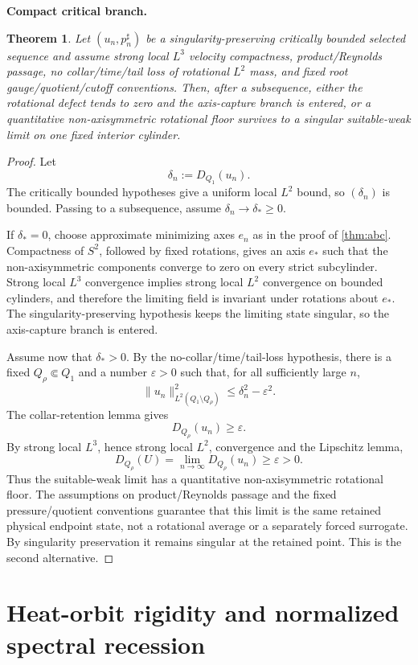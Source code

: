 \documentclass[11pt]{article}
\newtheorem{theorem}{Theorem}[section]
\theoremstyle{definition}\newtheorem{problem}[theorem]{Problem}
\theoremstyle{definition}
\theoremstyle{remark}
\begin{document}
\medskip
\noindent\textbf{Compact critical branch.}
\begin{theorem}
Let $(u_n,p_n^\sharp)$ be a singularity-preserving critically bounded selected
sequence and assume strong local $L^3$ velocity compactness, product/Reynolds
passage, no collar/time/tail loss of rotational $L^2$ mass, and fixed root
gauge/quotient/cutoff conventions.  Then, after a subsequence, either the
rotational defect tends to zero and the axis-capture branch is entered, or a
quantitative non-axisymmetric rotational floor survives to a singular
suitable-weak limit on one fixed interior cylinder.
\end{theorem}

\begin{proof}
Let
\[
 \delta_n:=D_{Q_1}(u_n).
\]
The critically bounded hypotheses give a uniform local \(L^2\) bound, so
\((\delta_n)\) is bounded.  Passing to a subsequence, assume
\(\delta_n\to\delta_*\ge0\).

If \(\delta_*=0\), choose approximate minimizing axes \(e_n\) as in the proof
of \cref{thm:abc}.  Compactness of \(S^2\), followed by fixed rotations, gives
an axis \(e_*\) such that the non-axisymmetric components converge to zero on
every strict subcylinder.  Strong local \(L^3\) convergence implies strong
local \(L^2\) convergence on bounded cylinders, and therefore the limiting
field is invariant under rotations about \(e_*\).  The singularity-preserving
hypothesis keeps the limiting state singular, so the axis-capture branch is
entered.

Assume now that \(\delta_*>0\).  By the no-collar/time/tail-loss hypothesis,
there is a fixed \(Q_\rho\Subset Q_1\) and a number \(\varepsilon>0\) such that,
for all sufficiently large \(n\),
\[
 \|u_n\|_{L^2(Q_1\setminus Q_\rho)}^2
 \le \delta_n^2-\varepsilon^2.
\]
The collar-retention lemma gives
\[
 D_{Q_\rho}(u_n)\ge\varepsilon.
\]
By strong local \(L^3\), hence strong local \(L^2\), convergence and the
Lipschitz lemma,
\[
 D_{Q_\rho}(U)
 =\lim_{n\to\infty}D_{Q_\rho}(u_n)
 \ge\varepsilon>0.
\]
Thus the suitable-weak limit has a quantitative non-axisymmetric rotational
floor.  The assumptions on product/Reynolds passage and the fixed
pressure/quotient conventions guarantee that this limit is the same retained
physical endpoint state, not a rotational average or a separately forced
surrogate.  By singularity preservation it remains singular at the retained
point.  This is the second alternative.
\end{proof}


\section{Heat-orbit rigidity and normalized spectral recession}
\label{sec:heat-orbit-rigidity}
\end{document}

